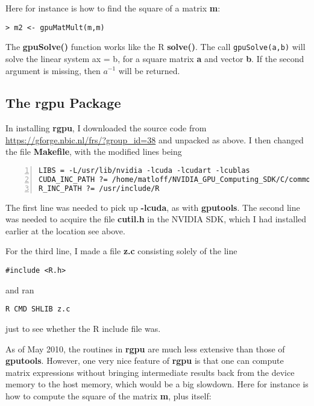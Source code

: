 Here for instance is how to find the square of a matrix {\bf m}:

\begin{lstlisting}
> m2 <- gpuMatMult(m,m)
\end{lstlisting}

The {\bf gpuSolve()} function works like the R {\bf solve()}.  The call
\lstinline{gpuSolve(a,b)} will solve the linear system ax = b, for a
square matrix {\bf a} and vector {\bf b}.  If the second argument is
missing, then $a^{-1}$ will be returned.

\subsection{The rgpu Package}
\label{rgpu}

In installing {\bf rgpu}, I downloaded the source code from
\url{https://gforge.nbic.nl/frs/?group_id=38} and unpacked as above.  
I then changed the file {\bf Makefile}, with the modified lines being

\begin{lstlisting}[numbers=left]
LIBS = -L/usr/lib/nvidia -lcuda -lcudart -lcublas
CUDA_INC_PATH ?= /home/matloff/NVIDIA_GPU_Computing_SDK/C/common/inc
R_INC_PATH ?= /usr/include/R
\end{lstlisting}

The first line was needed to pick up {\bf -lcuda}, as with {\bf
gputools}.  The second line was needed to acquire the file {\bf cutil.h}
in the NVIDIA SDK, which I had installed earlier at the location see
above.

For the third line, I made a file {\bf z.c} consisting solely of the
line

\begin{lstlisting}
#include <R.h>
\end{lstlisting}

and ran

\begin{lstlisting}
R CMD SHLIB z.c
\end{lstlisting}

just to see whether the R include file was.

As of May 2010, the routines in {\bf rgpu} are much less extensive than
those of {\bf gputools}.  However, one very nice feature of {\bf rgpu} 
is that one can compute matrix expressions without bringing intermediate
results back from the device memory to the host memory, which would be a
big slowdown.  Here for instance is how to compute the square of the
matrix {\bf m}, plus itself:


